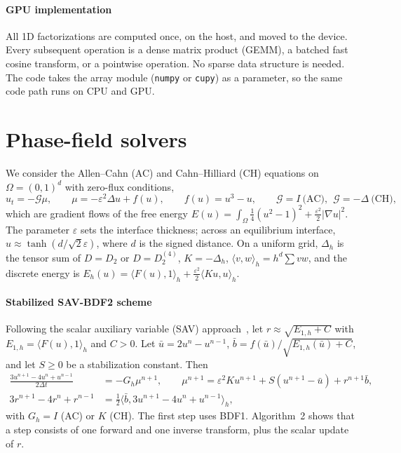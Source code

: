 \documentclass[preprint,12pt]{elsarticle}
\theoremstyle{remark}
\begin{document}
\paragraph{GPU implementation}
All 1D factorizations are computed once, on the host, and moved to the device. Every subsequent
operation is a dense matrix product (GEMM), a batched fast cosine transform, or a pointwise operation.
No sparse data structure is needed. The code takes the array module (\texttt{numpy} or \texttt{cupy})
as a parameter, so the same code path runs on CPU and GPU.

\section{Phase-field solvers}\label{sec:pf}
We consider the Allen--Cahn (AC) and Cahn--Hilliard (CH) equations on $\Omega=(0,1)^d$ with zero-flux
conditions,
\begin{equation}
u_t=-\mathcal G\mu,\qquad \mu=-\varepsilon^2\Delta u+f(u),\qquad f(u)=u^3-u,\qquad
\mathcal G=I\ \text{(AC)},\ \ \mathcal G=-\Delta\ \text{(CH)},
\end{equation}
which are gradient flows of the free energy
$E(u)=\int_\Omega\tfrac14(u^2-1)^2+\tfrac{\varepsilon^2}{2}|\nabla u|^2$. The parameter $\varepsilon$ sets the
interface thickness; across an equilibrium interface, $u\approx\tanh(d/\sqrt2\varepsilon)$, where $d$ is the
signed distance. On a uniform grid, $\Delta_h$ is the tensor sum of $D=D_2$ or $D=D_2^{(4)}$,
$K=-\Delta_h$, $\langle v,w\rangle_h=h^d\sum vw$, and the discrete energy is
$E_h(u)=\langle F(u),1\rangle_h+\tfrac{\varepsilon^2}{2}\langle Ku,u\rangle_h$.

\paragraph{Stabilized SAV-BDF2 scheme}
Following the scalar auxiliary variable (SAV) approach~\cite{shen2018scalar}, let
$r\approx\sqrt{E_{1,h}+C}$ with $E_{1,h}=\langle F(u),1\rangle_h$ and $C>0$. Let $\bar u=2u^n-u^{n-1}$,
$\bar b=f(\bar u)/\sqrt{E_{1,h}(\bar u)+C}$, and let $S\ge0$ be a stabilization constant. Then
\begin{align}
\frac{3u^{n+1}-4u^n+u^{n-1}}{2\Delta t}&=-G_h\mu^{n+1},\qquad
\mu^{n+1}=\varepsilon^2Ku^{n+1}+S(u^{n+1}-\bar u)+r^{n+1}\bar b,\label{eq:sav1}\\
3r^{n+1}-4r^n+r^{n-1}&=\tfrac12\langle\bar b,3u^{n+1}-4u^n+u^{n-1}\rangle_h,\label{eq:sav2}
\end{align}
with $G_h=I$ (AC) or $K$ (CH). The first step uses BDF1. Algorithm~2 shows that a step consists of one
forward and one inverse transform, plus the scalar update of $r$.
\end{document}
